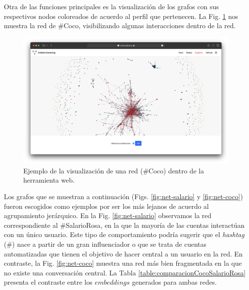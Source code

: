Otra de las funciones principales es la visualización de los grafos con sus respectivos nodos coloreados de acuerdo al perfil que pertenecen. La Fig. \ref{img:web-graph} nos muestra la red de \#Coco, visibilizando algunas interacciones dentro de la red.

 \begin{figure}
   \centering
   \includegraphics[width=1\textwidth]{images/web-graph.png}
    \caption{Ejemplo de la visualización de una red (\#Coco) dentro de la herramienta web.}
    \label{img:web-graph}
\end{figure}

Los grafos que se muestran a continuación (Figs. \ref{fig:net-salario} y \ref{fig:net-coco}) fueron escogidos como ejemplos por ser los más lejanos de acuerdo al agrupamiento jerárquico. En la Fig. \ref{fig:net-salario} observamos la red correspondiente al \#SalarioRosa, en la que la mayoría de las cuentas interactúan con un único usuario. Este tipo de comportamiento podría sugerir que el \textit{hashtag} (\#) nace a partir de un gran influenciador o que se trata de cuentas automatizadas que tienen el objetivo de hacer central a un usuario en la red. En contraste, la Fig. \ref{fig:net-coco} muestra una red más bien fragmentada en la que no existe una conversación central. La Tabla \ref{table:comparacionCocoSalarioRosa} presenta el contraste entre los $embeddings$ generados para ambas redes.

